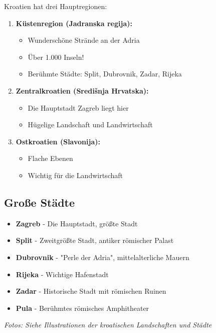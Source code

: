 \begin{culture}
Kroatien hat drei Hauptregionen:

\begin{enumerate}
    \item \textbf{Küstenregion (Jadranska regija):} 
    \begin{itemize}
        \item Wunderschöne Strände an der Adria
        \item Über 1.000 Inseln!
        \item Berühmte Städte: Split, Dubrovnik, Zadar, Rijeka
    \end{itemize}
    
    \item \textbf{Zentralkroatien (Središnja Hrvatska):}
    \begin{itemize}
        \item Die Hauptstadt Zagreb liegt hier
        \item Hügelige Landschaft und Landwirtschaft
    \end{itemize}
    
    \item \textbf{Ostkroatien (Slavonija):}
    \begin{itemize}
        \item Flache Ebenen
        \item Wichtig für die Landwirtschaft
    \end{itemize}
\end{enumerate}

\subsection*{Große Städte}

\begin{itemize}
    \item \textbf{Zagreb} - Die Hauptstadt, größte Stadt
    \item \textbf{Split} - Zweitgrößte Stadt, antiker römischer Palast
    \item \textbf{Dubrovnik} - "Perle der Adria", mittelalterliche Mauern
    \item \textbf{Rijeka} - Wichtige Hafenstadt
    \item \textbf{Zadar} - Historische Stadt mit römischen Ruinen
    \item \textbf{Pula} - Berühmtes römisches Amphitheater
\end{itemize}

\textit{Fotos: Siehe Illustrationen der kroatischen Landschaften und Städte}
\end{culture}

